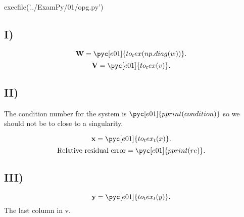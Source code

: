 \documentclass[../main.tex]{subfiles}
\begin{document}
\begin{pycode}[e01]
execfile('../ExamPy/01/opg.py')
\end{pycode}

\subsection*{I)}%
\label{sub:i}
\[
	\textbf{W}= \pyc[e01]{to_tex(np.diag(w))}
.\] 
\[
	\textbf{V}=\pyc[e01]{to_tex(v)}
.\] 
\subsection*{II)}%
\label{sub:ii}

The condition number for the system is $\pyc[e01]{pprint(condition)}$ so we should not be to close to a singularity.

\[
	\textbf{x} = \pyc[e01]{to_tex_t(x)}
.\] 
\[
	\textrm{Relative residual error}=\pyc[e01]{pprint(re)}
.\] 
\subsection*{III)}%
\label{sub:iii}
\[
	\textbf{y}=\pyc[e01]{to_tex_t(y)}
.\] 
The last column in v.

\inputminted{python}{../ExamPy/01/opg.py}

	
\end{document}
